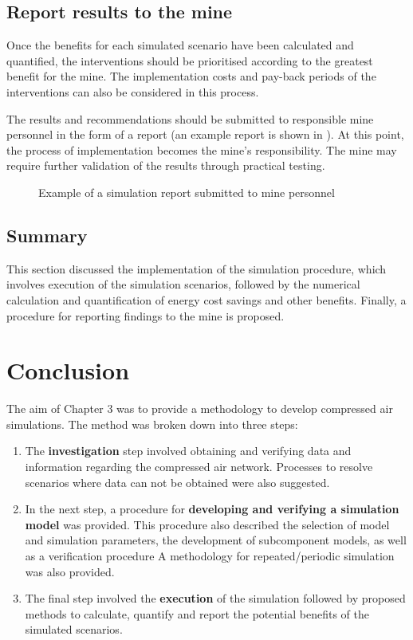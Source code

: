 		\subsection{Report results to the mine}
		Once the benefits for each simulated scenario have been calculated and quantified, the interventions should be prioritised according to the greatest benefit for the mine. The implementation costs and pay-back periods of the interventions can also be considered in this process.
		\par
		The results and recommendations should be submitted to responsible mine personnel in the form of a report (an example report is shown in ). At this point, the process of implementation becomes the mine's responsibility. The mine may require further validation of the results through practical testing.
		\clearpage
		\begin{figure}[h]
			\centering
			\caption{Example of a simulation report submitted to mine personnel}
			\label{fig: Report example}
		\end{figure}

	\subsection{Summary}
	This section discussed the implementation of the simulation procedure, which involves execution of the simulation scenarios, followed by the numerical calculation and quantification of energy cost savings and other benefits. Finally, a procedure for reporting findings to the mine is proposed.
\section{Conclusion}
The aim of Chapter 3 was to provide a methodology to develop compressed air simulations. The method was broken down into three steps:
\begin{enumerate}
	\item The \textbf{investigation} step involved obtaining and verifying data and information regarding the compressed air network. Processes to resolve scenarios where data can not be obtained were also suggested.
	\item In the next step, a procedure for \textbf{developing and verifying a simulation model} was provided. This procedure also described the selection of model and simulation parameters, the development of subcomponent models, as well as a verification procedure A methodology for repeated/periodic simulation was also provided.
	\item The final step involved the \textbf{execution} of the simulation followed by proposed methods to calculate, quantify and report the potential benefits of the simulated scenarios.
\end{enumerate}
